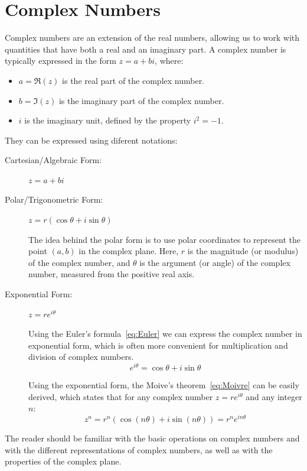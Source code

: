 \chapter{Complex Numbers}

Complex numbers are an extension of the real numbers, allowing us to work with quantities that have both a real and an imaginary part. A complex number is typically expressed in the form \( z = a + bi \), where:
\begin{itemize}
    \item \( a =\Re(z) \) is the real part of the complex number.
    \item \( b =\Im(z) \) is the imaginary part of the complex number.
    \item \( i \) is the imaginary unit, defined by the property \( i^2 = -1 \).
\end{itemize}

They can be expressed using diferent notations:
\begin{description}
    \item[Cartesian/Algebraic Form:] \( z = a + bi \)
    \item[Polar/Trigonometric Form:] \( z = r(\cos \theta + i \sin \theta) \)
    
    The idea behind the polar form is to use polar coordinates to represent the point $(a, b)$ in the complex plane. Here, \( r \) is the magnitude (or modulus) of the complex number, and \( \theta \) is the argument (or angle) of the complex number, measured from the positive real axis.
    \item[Exponential Form:] \( z = re^{i\theta} \)
    
    Using the Euler's formula~\eqref{eq:Euler} we can express the complex number in exponential form, which is often more convenient for multiplication and division of complex numbers.
    \begin{equation}
        e^{i\theta} = \cos \theta + i \sin \theta
        \label{eq:Euler}
    \end{equation}

    Using the exponential form, the Moive's theorem~\eqref{eq:Moivre} can be easily derived, which states that for any complex number \( z = re^{i\theta} \) and any integer \( n \):
    \begin{equation} 
        z^n = r^n \left( \cos(n\theta) + i \sin(n\theta) \right) = r^n e^{in\theta}
        \label{eq:Moivre}
    \end{equation}
\end{description}


The reader should be familiar with the basic operations on complex numbers and with the different representations of complex numbers, as well as with the properties of the complex plane.